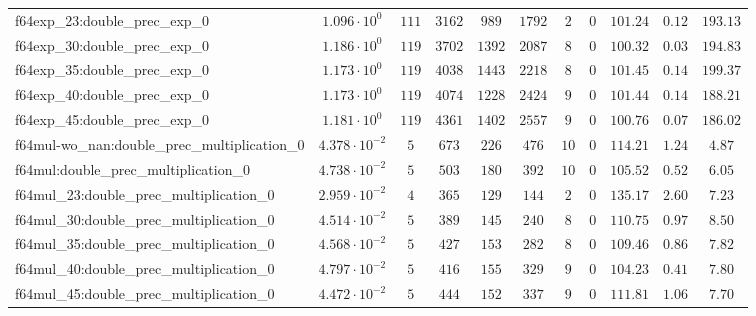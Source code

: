 \begin{tabular}{|l|c|c|c|c|c|c|c|c|c|c|}
f64exp\_23:double\_prec\_exp\_0                & $ 1.096 \cdot 10^{0}  $ & $ 111    $ & $ 3162   $ & $ 989   $ & $ 1792  $ & $ 2   $ & $ 0 $ & $ 101.24      $ & $ 0.12    $ & $ 193.13  $ \\
f64exp\_30:double\_prec\_exp\_0                & $ 1.186 \cdot 10^{0}  $ & $ 119    $ & $ 3702   $ & $ 1392  $ & $ 2087  $ & $ 8   $ & $ 0 $ & $ 100.32      $ & $ 0.03    $ & $ 194.83  $ \\
f64exp\_35:double\_prec\_exp\_0                & $ 1.173 \cdot 10^{0}  $ & $ 119    $ & $ 4038   $ & $ 1443  $ & $ 2218  $ & $ 8   $ & $ 0 $ & $ 101.45      $ & $ 0.14    $ & $ 199.37  $ \\
f64exp\_40:double\_prec\_exp\_0                & $ 1.173 \cdot 10^{0}  $ & $ 119    $ & $ 4074   $ & $ 1228  $ & $ 2424  $ & $ 9   $ & $ 0 $ & $ 101.44      $ & $ 0.14    $ & $ 188.21  $ \\
f64exp\_45:double\_prec\_exp\_0                & $ 1.181 \cdot 10^{0}  $ & $ 119    $ & $ 4361   $ & $ 1402  $ & $ 2557  $ & $ 9   $ & $ 0 $ & $ 100.76      $ & $ 0.07    $ & $ 186.02  $ \\
f64mul-wo\_nan:double\_prec\_multiplication\_0 & $ 4.378 \cdot 10^{-2} $ & $ 5      $ & $ 673    $ & $ 226   $ & $ 476   $ & $ 10  $ & $ 0 $ & $ 114.21      $ & $ 1.24    $ & $ 4.87    $ \\
f64mul:double\_prec\_multiplication\_0         & $ 4.738 \cdot 10^{-2} $ & $ 5      $ & $ 503    $ & $ 180   $ & $ 392   $ & $ 10  $ & $ 0 $ & $ 105.52      $ & $ 0.52    $ & $ 6.05    $ \\
f64mul\_23:double\_prec\_multiplication\_0     & $ 2.959 \cdot 10^{-2} $ & $ 4      $ & $ 365    $ & $ 129   $ & $ 144   $ & $ 2   $ & $ 0 $ & $ 135.17      $ & $ 2.60    $ & $ 7.23    $ \\
f64mul\_30:double\_prec\_multiplication\_0     & $ 4.514 \cdot 10^{-2} $ & $ 5      $ & $ 389    $ & $ 145   $ & $ 240   $ & $ 8   $ & $ 0 $ & $ 110.75      $ & $ 0.97    $ & $ 8.50    $ \\
f64mul\_35:double\_prec\_multiplication\_0     & $ 4.568 \cdot 10^{-2} $ & $ 5      $ & $ 427    $ & $ 153   $ & $ 282   $ & $ 8   $ & $ 0 $ & $ 109.46      $ & $ 0.86    $ & $ 7.82    $ \\
f64mul\_40:double\_prec\_multiplication\_0     & $ 4.797 \cdot 10^{-2} $ & $ 5      $ & $ 416    $ & $ 155   $ & $ 329   $ & $ 9   $ & $ 0 $ & $ 104.23      $ & $ 0.41    $ & $ 7.80    $ \\
f64mul\_45:double\_prec\_multiplication\_0     & $ 4.472 \cdot 10^{-2} $ & $ 5      $ & $ 444    $ & $ 152   $ & $ 337   $ & $ 9   $ & $ 0 $ & $ 111.81      $ & $ 1.06    $ & $ 7.70    $ \\

\end{tabular}

